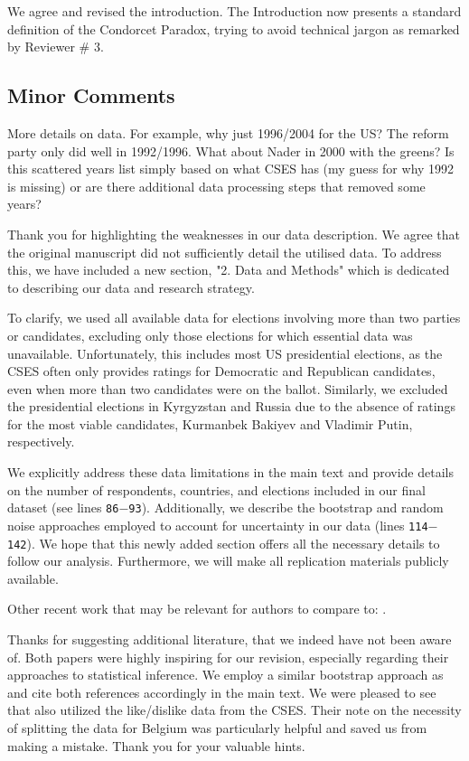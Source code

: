 \documentclass[a4paper, 12pt]{scrartcl}
\theoremstyle{break}
\newenvironment{changes}{\par\color{violet}\par\addvspace{\baselineskip}}{\par\addvspace{\baselineskip}}
\begin{document}
We agree and revised the introduction. The Introduction now presents a standard definition of the Condorcet Paradox, trying to avoid technical jargon as remarked by Reviewer \# $3$.

\subsection*{Minor Comments}
\begin{changes}
More details on data. For example, why just 1996/2004 for the US? The reform party only did well in 1992/1996. What about Nader in 2000 with the greens? Is this scattered years list simply based on what CSES has (my guess for why 1992 is missing) or are there additional data processing steps that removed some years?
\end{changes}
Thank you for highlighting the weaknesses in our data description. We agree that the original manuscript did not sufficiently detail the utilised data. To address this, we have included a new section, "2. Data and Methods" which is dedicated to describing our data and research strategy. 

To clarify, we used all available data for elections involving more than two parties or candidates, excluding only those elections for which essential data was unavailable. Unfortunately, this includes most US presidential elections, as the CSES often only provides ratings for Democratic and Republican candidates, even when more than two candidates were on the ballot. Similarly, we excluded the presidential elections in Kyrgyzstan and Russia due to the absence of ratings for the most viable candidates, Kurmanbek Bakiyev and Vladimir Putin, respectively.

We explicitly address these data limitations in the main text and provide details on the number of respondents, countries, and elections included in our final dataset (see lines \texttt{86$-$93}). Additionally, we describe the bootstrap and random noise approaches employed to account for uncertainty in our data (lines \texttt{114$-$142}). We hope that this newly added section offers all the necessary details to follow our analysis. Furthermore, we will make all replication materials publicly available.

\begin{changes}
Other recent work that may be relevant for authors to compare to: \cite{Desai2025, Darmann2019}.
\end{changes}

Thanks for suggesting additional literature, that we indeed have not been aware of. Both papers were highly inspiring for our revision, especially regarding their approaches to statistical inference. We employ a similar bootstrap approach as \citeauthor{Darmann2019} and cite both references accordingly in the main text.  We were pleased to see that \cite{Desai2025} also utilized the like/dislike data from the CSES. Their note on the necessity of splitting the data for Belgium was particularly helpful and saved us from making a mistake. Thank you for your valuable hints.
\end{document}
